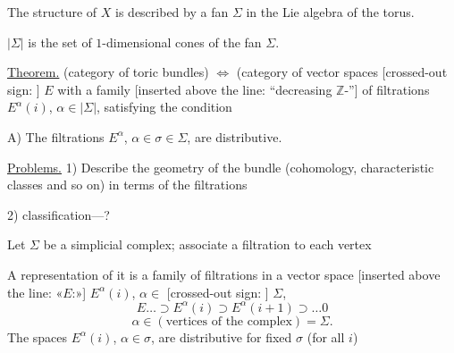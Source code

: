 The structure of $X$ is described by a fan $\Sigma$ in the Lie algebra of the torus.
\begin{center}
\end{center}
$|\Sigma|$ is the set of $1$-dimensional cones of the fan $\Sigma$.

\underline{Theorem.}
(category of toric bundles) $\Longleftrightarrow$
(category of vector spaces
[crossed-out sign:
]
$E$ with a family [inserted above the line: “decreasing $\mathbb Z$-”]
of filtrations $E^\alpha(i)$, $\alpha\in|\Sigma|$, satisfying the condition

A) The filtrations $E^\alpha$, $\alpha\in\sigma\in\Sigma$,
are distributive.

\underline{Problems.}
1) Describe the geometry of the bundle (cohomology, characteristic classes
and so on) in terms of the filtrations

2) classification---?

Let $\Sigma$ be a simplicial complex; associate a filtration
to each vertex

A representation of it is a family of filtrations in a vector space
[inserted above the line: «$E$:»] $E^\alpha(i)$,
$\alpha\in$ [crossed-out sign:
]
$\Sigma$,
\begin{equation*}
E\ldots\supset E^\alpha(i)\supset E^\alpha(i+1)\supset\ldots 0
\end{equation*}
\begin{equation*}
\alpha\in(\text{vertices of the complex})=\Sigma.
\end{equation*}
The spaces $E^\alpha(i)$, $\alpha\in\sigma$, are distributive for fixed $\sigma$
(for all $i$)

